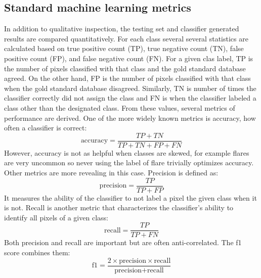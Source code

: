 \documentclass[twoside]{report}
\begin{document}
\subsection{Standard machine learning metrics}
In addition to qualitative inspection, the testing set and classifier generated results are compared quantitatively. For each class several several statistics are calculated based on true positive count (TP), true negative count (TN), false positive count (FP), and false negative count (FN). For a given clas label, TP is the number of pixels classified with that class and the gold standard database agreed. On the other hand, FP is the number of pixels classified with that class when the gold standard database disagreed. Similarly, TN is number of times the classifier correctly did not assign the class and FN is when the classifier labeled a class other than the designated class. From these values, several metrics of performance are derived. One of the more widely known metrics is accuracy, how often a classifier is correct:
\[\text{accuracy} = \frac{TP + TN}{TP + TN + FP + FN}\] However, accuracy is not as helpful when classes are skewed, for example flares are very uncommon so never using the label of flare trivially optimizes accuracy. Other metrics are more revealing in this case. Precision is defined as:
\[ \text{precision} = \frac{TP}{TP + FP} \]
It measures the ability of the classifier to not label a pixel the given class when it is not. Recall is another metric that characterizes the classifier's ability to identify all pixels of a given class:
\[\text{recall} = \frac{TP}{TP + FN}\]
Both precision and recall are important but are often anti-correlated. The f1 score combines them:
\[\text{f1} = \frac{2 \times \text{precision} \times \text{recall}}{\text{precision} + \text{recall}}\]
\end{document}
